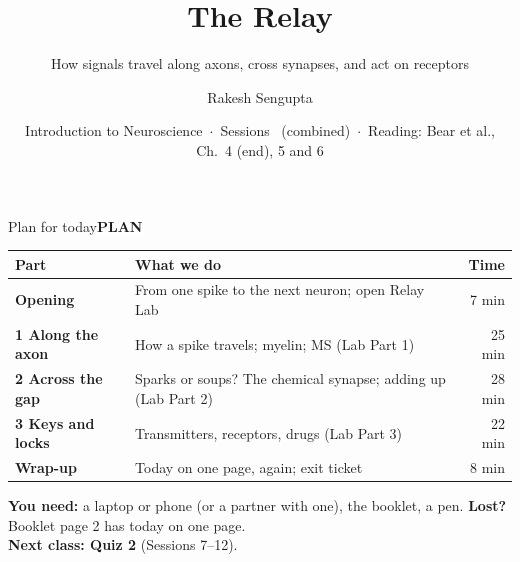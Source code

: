 \documentclass[aspectratio=169,11pt]{beamer}
\title{The Relay}
\subtitle{How signals travel along axons, cross synapses, and act on receptors}
\author{Rakesh Sengupta}
\institute{School of Interwoven Arts and Sciences, Krea University}
\date{Introduction to Neuroscience \,$\cdot$\, Sessions \sessnum\ (combined) \,$\cdot$\, Reading: Bear et al., Ch.~4 (end), 5 and 6}
\newcommand{\tagpill}[3]{{\normalfont\footnotesize\setlength{\fboxsep}{2.5pt}\colorbox{#1}{\textcolor{#2}{\bfseries #3}}}}
\newcommand{\tPlan}{\tagpill{white}{kprimary}{PLAN}}
\begin{document}
\begin{frame}[plain]
  \vspace{1.2cm}
  \titlepage
\end{frame}

\begin{frame}{Plan for today}{\tPlan}
  \renewcommand{\arraystretch}{1.3}
  \begin{tabular}{@{}>{\raggedright\arraybackslash\bfseries}p{3.3cm}>{\raggedright\arraybackslash}p{8.0cm}r@{}}
    \toprule
    Part & What we do & Time\\
    \midrule
    Opening & From one spike to the next neuron; open Relay Lab & 7 min\\
    1 Along the axon & How a spike travels; myelin; MS (Lab Part 1) & 25 min\\
    2 Across the gap & Sparks or soups? The chemical synapse; adding up (Lab Part 2) & 28 min\\
    3 Keys and locks & Transmitters, receptors, drugs (Lab Part 3) & 22 min\\
    Wrap-up & Today on one page, again; exit ticket & 8 min\\
    \bottomrule
  \end{tabular}
  \vspace{0.6em}

  \small\textbf{You need:} a laptop or phone (or a partner with one), the booklet, a pen. \textbf{Lost?} Booklet page 2 has today on one page.\\[2pt]
  \textbf{Next class: Quiz 2} (Sessions 7--12).
\end{frame}
\end{document}
